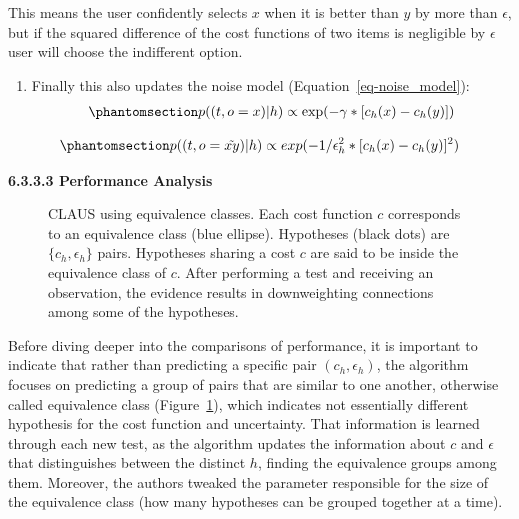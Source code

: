 \documentclass[
  letterpaper,
  numbers=noenddot,
  DIV=11]{scrreprt}
\providecommand{\tightlist}{%
  \setlength{\itemsep}{0pt}\setlength{\parskip}{0pt}}\usepackage{longtable,booktabs,array}
\theoremstyle{definition}
\theoremstyle{plain}
\theoremstyle{plain}
\theoremstyle{remark}
\begin{document}
This means the user confidently selects \(x\) when it is better than
\(y\) by more than \(\epsilon\), but if the squared difference of the
cost functions of two items is negligible by \(\epsilon\) user will
choose the indifferent option.

\begin{enumerate}
\def\labelenumi{\arabic{enumi}.}
\setcounter{enumi}{2}
\tightlist
\item
  Finally this also updates the noise model
  (Equation~\ref{eq-noise_model}):
  \begin{equation}\phantomsection\label{eq-eq3.33}{\begin{aligned}
  p((t, o = x) | h) \propto \exp(-\gamma * [c_h(x) - c_h(y)])
  \end{aligned}}\end{equation}
\end{enumerate}

\begin{equation}\phantomsection\label{eq-eq3.34}{\begin{aligned}
    p((t, o = \tilde{xy}) | h) \propto exp(-1/\epsilon_h^2 * [c_h(x) - c_h(y)]^2)
\end{aligned}}\end{equation}

\textbf{6.3.3.3 Performance Analysis}

\begin{figure}


\caption{\label{fig-equiv_c}CLAUS using equivalence classes. Each cost
function \(c\) corresponds to an equivalence class (blue ellipse).
Hypotheses (black dots) are \(\{c_h,\epsilon_h\}\) pairs. Hypotheses
sharing a cost \(c\) are said to be inside the equivalence class of
\(c\). After performing a test and receiving an observation, the
evidence results in downweighting connections among some of the
hypotheses.}

\end{figure}%

Before diving deeper into the comparisons of performance, it is
important to indicate that rather than predicting a specific pair
\((c_h, \epsilon_h)\), the algorithm focuses on predicting a group of
pairs that are similar to one another, otherwise called equivalence
class (Figure~\ref{fig-equiv_c}), which indicates not essentially
different hypothesis for the cost function and uncertainty. That
information is learned through each new test, as the algorithm updates
the information about \(c\) and \(\epsilon\) that distinguishes between
the distinct \(h\), finding the equivalence groups among them. Moreover,
the authors tweaked the parameter responsible for the size of the
equivalence class (how many hypotheses can be grouped together at a
time).
\end{document}
